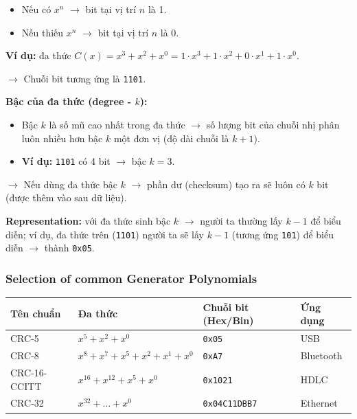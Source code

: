 \begin{itemize}
    \item Nếu có $x^n$ $\rightarrow$ bit tại vị trí $n$ là 1.
    \item Nếu thiếu $x^n$ $\rightarrow$ bit tại vị trí $n$ là 0.
\end{itemize}
\medskip

\noindent
\textbf{Ví dụ:} đa thức $C(x) = x^3 + x^2 + x^0 = 1 \cdot x^3 + 1 \cdot x^2 + 0 \cdot x^1 + 1 \cdot x^0$.

$\rightarrow$ Chuỗi bit tương ứng là \texttt{1101}.
\medskip

\noindent
\textbf{Bậc của đa thức (degree - $k$):}

\begin{itemize}
    \item Bậc $k$ là số mũ cao nhất trong đa thức $\rightarrow$ số lượng bit của chuỗi nhị phân luôn nhiều hơn bậc $k$ một đơn vị (độ dài chuỗi là $k+1$).
    \item \textbf{Ví dụ:} \texttt{1101} có 4 bit $\rightarrow$ bậc $k = 3$.
\end{itemize}
\medskip

\noindent
$\rightarrow$ Nếu dùng đa thức bậc $k$ $\rightarrow$ phần dư (checksum) tạo ra sẽ luôn có $k$ bit (được thêm vào sau dữ liệu).
\medskip

\noindent
\textbf{Representation:} với đa thức sinh bậc $k$ $\rightarrow$ người ta thường lấy $k-1$ để biểu diễn; ví dụ, đa thức trên (\texttt{1101}) người ta sẽ lấy $k-1$ (tương ứng \texttt{101}) để biểu diễn $\rightarrow$ thành \texttt{0x05}.
\medskip

\subsubsection{Selection of common Generator Polynomials}

\begin{table}[h]
    \renewcommand{\arraystretch}{1.2}
    \begin{tabular*}{\linewidth}{@{\extracolsep{\fill}}llll}
        \hline
        \textbf{Tên chuẩn} & \textbf{Đa thức} & \textbf{Chuỗi bit (Hex/Bin)} & \textbf{Ứng dụng} \\
        \hline
        CRC-5 & $x^5 + x^2 + x^0$ & \texttt{0x05} & USB \\
        CRC-8 & $x^8 + x^7 + x^5 + x^2 + x^1 + x^0$ & \texttt{0xA7} & Bluetooth \\
        CRC-16-CCITT & $x^{16} + x^{12} + x^5 + x^0$ & \texttt{0x1021} & HDLC \\
        CRC-32 & $x^{32} + ... + x^0$ & \texttt{0x04C11DBB7} & Ethernet \\
        \hline
    \end{tabular*}
\end{table}
\medskip


